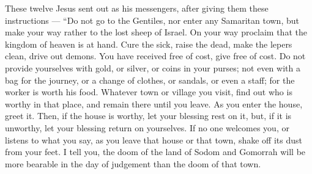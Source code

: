  These twelve Jesus sent out as his messengers, after giving
them these instructions --- ``Do not go to the Gentiles, nor enter any
Samaritan town,  but make your way rather to the lost sheep
of Israel.  On your way proclaim that the kingdom of heaven
is at hand.  Cure the sick, raise the dead, make the lepers
clean, drive out demons. You have received free of cost, give free of
cost.  Do not provide yourselves with gold, or silver, or
coins in your purses;  not even with a bag for the journey,
or a change of clothes, or sandals, or even a staff; for the worker is
worth his food.  Whatever town or village you visit, find
out who is worthy in that place, and remain there until you leave.
 As you enter the house, greet it.  Then, if
the house is worthy, let your blessing rest on it, but, if it is
unworthy, let your blessing return on yourselves.  If no
one welcomes you, or listens to what you say, as you leave that house or
that town, shake off its dust from your feet.  I tell you,
the doom of the land of Sodom and Gomorrah will be more bearable in the
day of judgement than the doom of that town.

